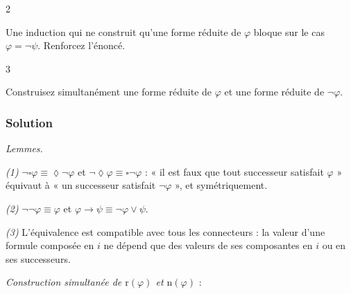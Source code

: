 \documentclass[11pt,a4paper]{article}
\providecommand{\Box}{\square}
\providecommand{\Diamond}{\lozenge}
\begin{document}
\begin{indication}{2}

Une induction qui ne construit qu'une forme réduite de \(\varphi\) bloque sur le cas \(\varphi=\neg\psi\). Renforcez l'énoncé.

\end{indication}

\begin{indication}{3}

Construisez simultanément une forme réduite de \(\varphi\) et une forme réduite de \(\neg\varphi\).

\end{indication}

\hypertarget{solution-26}{%
\subsubsection{Solution}\label{solution-26}}

\emph{Lemmes.}

\emph{(1)} \(\neg\Box\varphi\equiv\Diamond\neg\varphi\) et \(\neg\Diamond\varphi\equiv\Box\neg\varphi\) : « il est faux que tout successeur satisfait \(\varphi\) » équivaut à « un successeur satisfait \(\neg\varphi\) », et symétriquement.

\emph{(2)} \(\neg\neg\varphi\equiv\varphi\) et \(\varphi\to\psi\equiv\neg\varphi\vee\psi\).

\emph{(3)} L'équivalence est compatible avec tous les connecteurs : la valeur d'une formule composée en \(i\) ne dépend que des valeurs de ses composantes en \(i\) ou en ses successeurs.

\emph{Construction simultanée de \(\mathrm r(\varphi)\) et \(\mathrm n(\varphi)\)} :
\end{document}
